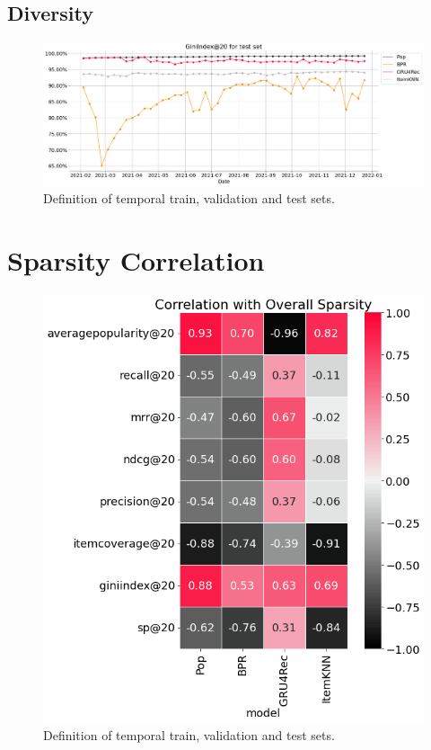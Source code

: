 \pagebreak
\subsection{Diversity}

\begin{figure}[h]
    \centering
    \includegraphics[width=\textwidth]{figs/chap5/test_set_GiniIndex@20.png}
    \caption{Definition of temporal train, validation and test sets.}
    \label{fig:test_set_gini}
\end{figure}


\pagebreak
\section{Sparsity Correlation}

\begin{figure}[h]
    \centering
    \includegraphics[width=\textwidth]{figs/chap5/all_models_correlation.png}
    \caption{Definition of temporal train, validation and test sets.}
    \label{fig:all_models_correlation}
\end{figure}
